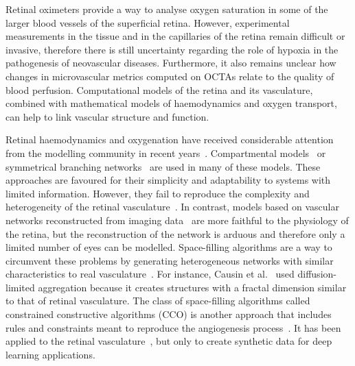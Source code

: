 \documentclass[11pt,]{article}
\begin{document}
Retinal oximeters provide a way to analyse oxygen saturation in some of the larger blood vessels of the superficial retina.
However, experimental measurements in the tissue and in the capillaries of the retina remain difficult or invasive, therefore there is still uncertainty regarding the role of hypoxia in the pathogenesis of neovascular diseases.
Furthermore, it also remains unclear
how changes in microvascular metrics computed on OCTAs relate to the
quality of blood perfusion. Computational models of the retina and its
vasculature, combined with mathematical models of haemodynamics and
oxygen transport, can help to link vascular structure and function.

Retinal haemodynamics and oxygenation have received considerable
attention from the modelling community in recent
years~\cite{Arciero2008,Bernabeu2014,Causin2016,Chiaravalli2022,DoblhoffDier2014,
  Fry2020,Guidoboni2014,Hernandez2023,Takahashi2009,Zhu2019,Yu2019}.
Compartmental models~\cite{Arciero2008,Guidoboni2014,Chiaravalli2022}
or symmetrical branching
networks~\cite{Chiaravalli2022,Takahashi2009,Zhu2019} are used in many
of these models. These approaches are favoured for their simplicity
and adaptability to systems with limited information. However, they
fail to reproduce the complexity and heterogeneity of the retinal
vasculature~\cite{Yu2019}. In contrast, models based on vascular
networks reconstructed from imaging data~\cite{Bernabeu2014,Fry2020}
are more faithful to the physiology of the retina, but the
reconstruction of the network is arduous and therefore only a limited
number of eyes can be modelled. Space-filling algorithms are a way to
circumvent these problems by generating heterogeneous networks with
similar characteristics to real
vasculature~\cite{Causin2016,Linninger2013,Talou2021}. For instance,
Causin et al.~\cite{Causin2016} used diffusion-limited aggregation because it creates structures with a fractal dimension similar to that of retinal vasculature.
The class of space-filling algorithms called constrained constructive algorithms
(CCO) is another approach that includes rules and constraints meant to
reproduce the angiogenesis process~\cite{Linninger2013,Talou2021}. It
has been applied to the retinal
vasculature~\cite{Brown2023,LoCastro2020}, but only to create
synthetic data for deep learning applications.
\end{document}
